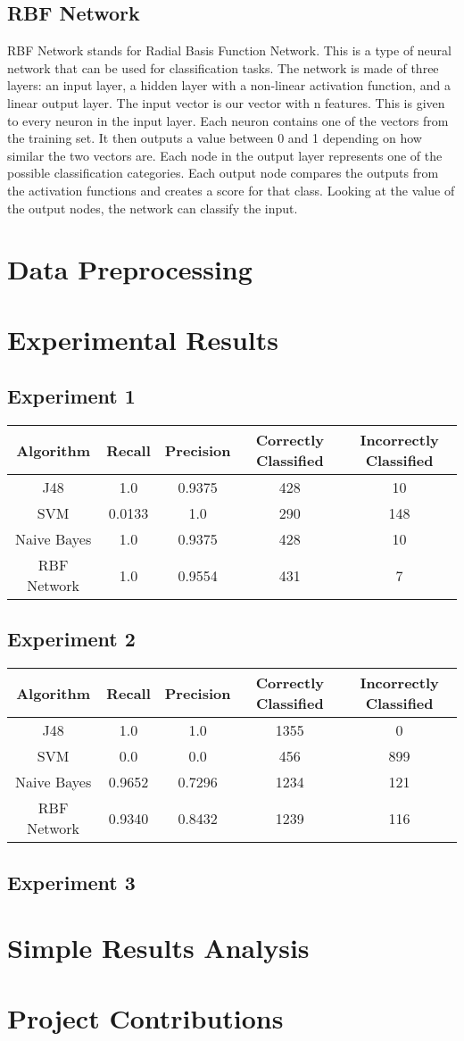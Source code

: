 \documentclass[]{article}
\begin{document}
\subsection{RBF Network}
RBF Network stands for Radial Basis Function Network. This is a type of neural network that can be used for classification tasks. The network is made of three layers: an input layer, a hidden layer with a non-linear activation function, and a linear output layer. The input vector is our vector with n features. This is given to every neuron in the input layer. Each neuron contains one of the vectors from the training set. It then outputs a value between 0 and 1 depending on how similar the two vectors are. Each node in the output layer represents one of the possible classification categories. Each output node compares the outputs from the activation functions and creates a score for that class. Looking at the value of the output nodes, the network can classify the input.

\section{Data Preprocessing}

\section{Experimental Results}
\subsection{Experiment 1}
\begin{tabular}{c | c | c| c | c}
Algorithm & Recall & Precision & Correctly Classified & Incorrectly Classified \\ \hline
J48 & 1.0 & 0.9375 & 428 & 10 \\ 
SVM & 0.0133 & 1.0 & 290 & 148 \\
Naive Bayes & 1.0 & 0.9375 &  428 & 10 \\
RBF Network & 1.0 & 0.9554 & 431 & 7 \\
\end{tabular}
\subsection{Experiment 2}
\begin{tabular}{c | c | c| c | c}
Algorithm & Recall & Precision & Correctly Classified & Incorrectly Classified \\ \hline
J48 & 1.0 & 1.0 & 1355 & 0 \\ 
SVM & 0.0 & 0.0 & 456 & 899 \\
Naive Bayes & 0.9652 & 0.7296 & 1234 & 121 \\
RBF Network & 0.9340 & 0.8432 & 1239 & 116 \\
\end{tabular}
\subsection{Experiment 3}

\section{Simple Results Analysis}

\section{Project Contributions}
\end{document}
